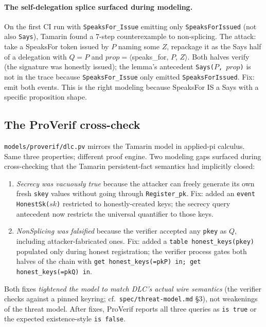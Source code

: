 \paragraph{The self-delegation splice surfaced during modeling.}
On the first CI run with \texttt{SpeaksFor\_Issue} emitting only
\texttt{SpeaksForIssued} (not also \texttt{Says}), Tamarin found a
7-step counterexample to non-splicing.  The attack: take a SpeaksFor
token issued by $P$ naming some $Z$, repackage it as the Says half
of a delegation with $Q = P$ and $\mathit{prop} = \langle$speaks\_for,
$P$, $Z\rangle$.  Both halves verify (the signature was honestly
issued); the lemma's antecedent \texttt{Says($P$, $\mathit{prop}$)} is
not in the trace because \texttt{SpeaksFor\_Issue} only emitted
\texttt{SpeaksForIssued}.  Fix: emit both events.  This is the right
modeling because SpeaksFor IS a Says with a specific proposition shape.

\subsection{The ProVerif cross-check}

\texttt{models/proverif/dlc.pv} mirrors the Tamarin model in
applied-pi calculus.  Same three properties; different proof engine.
Two modeling gaps surfaced during cross-checking that the Tamarin
persistent-fact semantics had implicitly closed:

\begin{enumerate}
\item \emph{Secrecy was vacuously true} because the attacker can
  freely generate its own fresh \texttt{skey} values without going
  through \texttt{Register\_pk}.  Fix: added an \texttt{event
  HonestSk($sk$)} restricted to honestly-created keys; the secrecy
  query antecedent now restricts the universal quantifier to those
  keys.
\item \emph{NonSplicing was falsified} because the verifier accepted
  any \texttt{pkey} as $Q$, including attacker-fabricated ones.
  Fix: added a \texttt{table honest\_keys(pkey)} populated only
  during honest registration; the verifier process gates both
  halves of the chain with \texttt{get honest\_keys(=pkP) in;
  get honest\_keys(=pkQ) in}.
\end{enumerate}

Both fixes \emph{tightened the model to match DLC's actual wire
semantics} (the verifier checks against a pinned keyring; cf.\
\texttt{spec/threat-model.md} \S 3), not weakenings of the threat
model.  After fixes, ProVerif reports all three queries as
\texttt{is true} or the expected existence-style \texttt{is false}.

